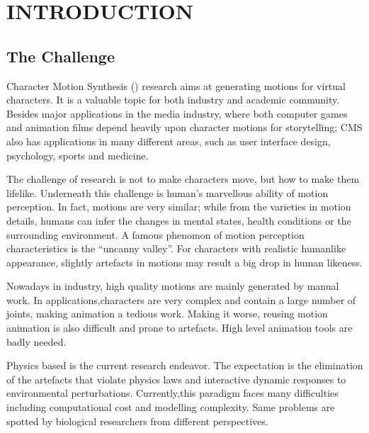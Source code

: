 \chapter{INTRODUCTION}
\label{chap:intro}
\graphicspath{{Introduction/IntroductionFigs/EPS/}{Introduction/IntroductionFigs/}}

\section{The Challenge}
Character Motion Synthesis (\cms) research aims at generating motions for virtual characters.
It is a valuable topic for both industry and academic community. 
Besides major applications in the media industry, where both computer games and animation films depend heavily upon character motions for storytelling;  
CMS also has applications in many different areas, such as user interface design, psychology, sports and medicine.

The challenge of \cms research is not to make characters move, but how to make them lifelike. 
Underneath this challenge is human's marvellous ability of motion perception. 
In fact, motions are very similar; 
while from the varieties in motion details, humans can infer the changes in mental states, health conditions or the surrounding environment.
A famous phenomon of motion perception characteristics is the ``uncanny valley''.
For characters with realistic humanlike appearance, slightly artefacts in motions may result a big drop in human likeness.



Nowadays in industry, high quality motions are mainly generated by manual work. 
In applications,characters are very complex and contain a large number of joints, making animation a tedious work.
Making it worse, reusing motion animation is also difficult and prone to artefacts.
High level animation tools are badly needed. 

Physics based \cms is the current research endeavor.
The expectation is the elimination of the artefacts that violate physics laws and interactive dynamic responses to environmental perturbations.
Currently,this paradigm faces many difficulties including computational cost and modelling complexity.
Same problems are spotted by biological researchers from different perspectives.

